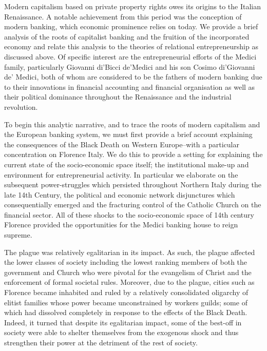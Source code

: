 Modern capitalism based on private property rights owes its origins to the Italian Renaissance. A notable achievement from this period was the conception of modern banking, which economic prominence relies on today. We provide a brief analysis of the roots of capitalist banking and the fruition of the incorporated economy and relate this analysis to the theories of relational entrepreneurship as discussed above. Of specific interest are the entrepreneurial efforts of the Medici family, particularly Giovanni di'Bicci de'Medici and his son Cosimo di'Giovanni de' Medici, both of whom are considered to be the fathers of modern banking due to their innovations in financial accounting and financial organisation as well as their political dominance throughout the Renaissance and the industrial revolution.

To begin this analytic narrative, and to trace the roots of modern capitalism and the European banking system, we must first provide a brief account explaining the consequences of the Black Death on Western Europe--with a particular concentration on Florence Italy. We do this to provide a setting for explaining the current state of the socio-economic space itself; the institutional make-up and environment for entrepreneurial activity. In particular we elaborate on the subsequent power-struggles which persisted throughout Northern Italy during the late 14th Century, the political and economic network disjunctures which consequentially emerged and the fracturing control of the Catholic Church on the financial sector. All of these shocks to the socio-economic space of 14th century Florence provided the opportunities for the Medici banking house to reign supreme.

The plague was relatively egalitarian in its impact. As such, the plague affected the lower classes of society including the lowest ranking members of both the government and Church who were pivotal for the evangelism of Christ and the enforcement of formal societal rules. Moreover, due to the plague, cities such as Florence became inhabited and ruled by a relatively consolidated oligarchy of elitist families whose power became unconstrained by workers guilds; some of which had dissolved completely in response to the effects of the Black Death. Indeed, it turned that despite its egalitarian impact, some of the best-off in society were able to shelter themselves from the exogenous shock and thus strengthen their power at the detriment of the rest of society.

